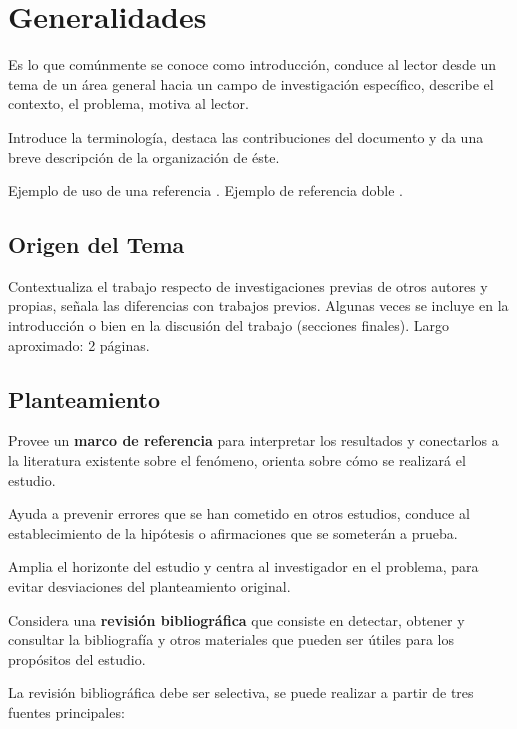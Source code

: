 \documentclass[letter,12pt]{report}
\newcommand\naranjo[1]{\textcolor[rgb]{1.00,0.36,0.06}{\textbf{#1}}}
\begin{document}
\tableofcontents
\listoffigures
\renewcommand{\listtablename}{Índice de tablas}
\listoftables
\renewcommand{\lstlistlistingname}{Índice de Algoritmos}
\lstlistoflistings

\cleardoublepage
{}
\setcounter{page}{1}

\chapter{Generalidades}

Es lo que comúnmente se conoce como introducción, conduce al lector desde un tema de un área general hacia un campo de investigación específico, describe el contexto, el problema, motiva al lector.

Introduce la terminología, destaca las contribuciones del documento y da una breve descripción de la organización de éste.

Ejemplo de uso de una referencia \cite{SN01}. Ejemplo de referencia doble \cite{ABC02,JanChomicki2008}.


\section{Origen del Tema}
Contextualiza el trabajo respecto de investigaciones previas de otros autores y propias, señala las diferencias con trabajos previos. Algunas veces se incluye en la introducción o bien en la discusión del trabajo (secciones finales). Largo aproximado: 2 páginas.
\section{Planteamiento}

Provee un \naranjo{marco de referencia} para interpretar los resultados y conectarlos a la literatura existente sobre el fenómeno, orienta sobre cómo se realizará el estudio.

 Ayuda a prevenir errores que se han cometido en otros estudios, conduce al establecimiento de la hipótesis o afirmaciones que se someterán a prueba.
 
 Amplia el horizonte del estudio y centra al investigador en el problema, para evitar desviaciones del planteamiento original.

Considera una \naranjo{revisión bibliográfica} que consiste en detectar, obtener y consultar la bibliografía y otros materiales que pueden ser útiles para los propósitos del estudio.

La revisión bibliográfica debe ser selectiva, se puede realizar a partir de tres fuentes principales:
\end{document}
